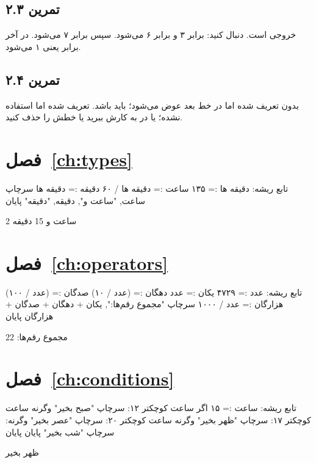 \subsection*{تمرین ۲.۳}
خروجی  است. دنبال کنید:  برابر ۳ و  برابر
۶ می‌شود. سپس  برابر ۷ می‌شود. در آخر  برابر
 یعنی ۱ می‌شود.

\subsection*{تمرین ۲.۴}
 بدون  تعریف شده اما در خط بعد عوض می‌شود؛ باید
 باشد.  تعریف شده اما
استفاده نشده؛ یا در  به کارش ببرید یا خطش را حذف کنید.

\section*{فصل~\ref{ch:types}}

\begin{salamfa}
تابع ریشه:
    دقیقه ها := ۱۳۵
    ساعت := دقیقه ها / ۶۰
    دقیقه := دقیقه ها %
    سرچاپ ساعت, "ساعت و", دقیقه, "دقیقه"
پایان
\end{salamfa}
\begin{outputfa}
2 ساعت و 15 دقیقه
\end{outputfa}

\section*{فصل~\ref{ch:operators}}

\begin{salamfa}
تابع ریشه:
    عدد := ۴۷۲۹
    یکان := عدد %
    دهگان := (عدد / ۱۰) %
    صدگان := (عدد / ۱۰۰) %
    هزارگان := عدد / ۱۰۰۰
    سرچاپ "مجموع رقم‌ها:", یکان + دهگان + صدگان + هزارگان
پایان
\end{salamfa}
\begin{outputfa}
مجموع رقم‌ها: 22
\end{outputfa}

\section*{فصل~\ref{ch:conditions}}

\begin{salamfa}
تابع ریشه:
    ساعت := ۱۵
    اگر ساعت کوچکتر ۱۲:
        سرچاپ "صبح بخیر"
    وگرنه ساعت کوچکتر ۱۷:
        سرچاپ "ظهر بخیر"
    وگرنه ساعت کوچکتر ۲۰:
        سرچاپ "عصر بخیر"
    وگرنه:
        سرچاپ "شب بخیر"
    پایان
پایان
\end{salamfa}
\begin{outputfa}
ظهر بخیر
\end{outputfa}

